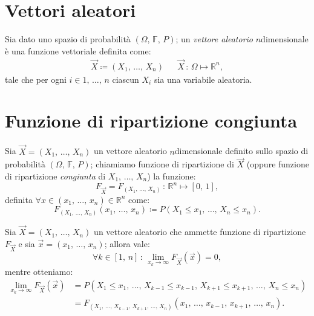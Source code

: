     \section{Vettori aleatori}
        \begin{defn}
            Sia dato uno spazio di probabilità $(\Omega,\,\mathbb{F},\,P)$; un \textit{vettore aleatorio} $n$\nbdash dimensionale è una funzione vettoriale definita come:
            \begin{align*}
                \vec{X} \coloneqq (X_1,\, \ldots,\, X_{n}) & &
                \vec{X}\,:\, \Omega \mapsto \mathbb{R}^n
            ,\end{align*}
            tale che per ogni $i \in 1,\, \ldots,\, n$ ciascun $X_i$ sia una variabile aleatoria.
        \end{defn}
    \section{Funzione di ripartizione congiunta}
        \begin{defn}
            Sia $\vec{X} = (X_1,\, \ldots,\, X_{n})$ un vettore aleatorio $n$\nbdash dimensionale definito sullo spazio di probabilità $(\Omega,\,\mathbb{F},\,P)$; chiamiamo funzione di ripartizione di $\vec{X}$ (oppure funzione di ripartizione \textit{congiunta} di $X_1,\, \ldots,\, X_{n}$) la funzione: \[
                F_{\vec{X}} = F_{(X_1,\, \ldots,\, X_{n})} \,:\, \mathbb{R}^n \mapsto [0,\,1]
            ,\] definita $\forall x \in (x_1,\, \ldots,\, x_{n}) \in \mathbb{R}^n$ come: \[
                F_{(X_1,\, \ldots,\, X_{n})}(x_1,\, \ldots,\, x_{n}) \coloneqq P(X_1 \leq x_1,\, \ldots,\, X_n \leq x_n)
            .\]
        \end{defn}
        \begin{prty}\label{prty:Convergenza_ripartizione_congiunta}
            Sia $\vec{X} = (X_1,\, \ldots,\, X_{n})$ un vettore aleatorio che ammette funzione di ripartizione $F_{\vec{X}}$ e sia $\vec{x} = (x_1,\, \ldots,\, x_{n})$; allora vale: \[
                \forall k \in [1,\,n] \,:\, \lim_{x_k \to \infty} F_{\vec{X}}(\vec{x}) = 0
            ,\] mentre otteniamo:
            \begin{align*}
                \lim_{x_k \to \infty} F_{\vec{X}}(\vec{x}) &= 
                P(X_1 \leq x_1,\, \ldots,\, X_{k-1} \leq x_{k-1},\, X_{k+1} \leq x_{k+1},\, \ldots,\, X_n \leq x_n) \\
                                                           &= F_{(X_1,\, \ldots,\, X_{k-1},\, X_{k+1},\, \ldots,\, X_{n})}(x_1,\, \ldots,\, x_{k-1},\, x_{k+1},\, \ldots,\, x_{n})
            .\end{align*}
        \end{prty}
